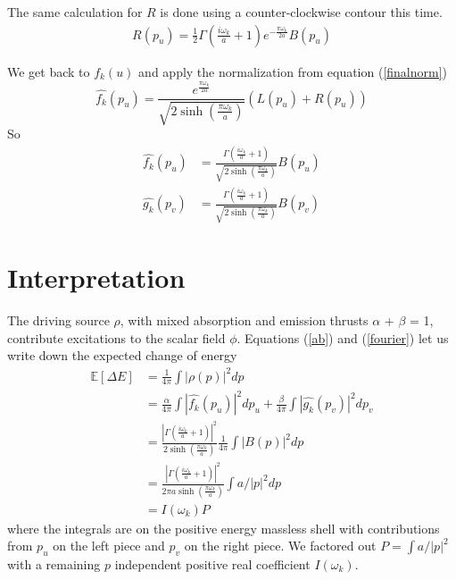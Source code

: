 \documentclass[12pt,a4paper]{article}
\begin{document}
The same calculation for $R$ is done using a counter-clockwise contour this time.
\begin{equation}
\begin{split}
  R(p_u) = \frac{1}{2}\Gamma\left(\frac{i\omega_k}{a} + 1\right) e^{-\frac{\pi \omega_k}{2a}} B(p_u)
\end{split}
\end{equation}

We get back to $f_k(u)$ and apply the normalization from equation (\ref{finalnorm})
\begin{equation}
\widehat{f_k}(p_u) = \frac{e^{\frac{\pi \omega_k}{2a}}}{\sqrt{2 \sinh \left({\frac{\pi\omega_k}{a}}\right)}}  ( L(p_u) + R(p_u) )
\end{equation}
So
\begin{equation}
\label{fourier}
\begin{split}
\widehat{f_k}(p_u) & = \frac{\Gamma\left(\frac{i\omega_k}{a} + 1\right)}{\sqrt{2 \sinh \left({\frac{\pi\omega_k}{a}}\right)}} B(p_u)\\
\widehat{g_k}(p_v) &= \frac{\Gamma\left(\frac{i\omega_k}{a} + 1\right)}{\sqrt{2 \sinh \left({\frac{\pi\omega_k}{a}}\right)}} B(p_v)
\end{split}
\end{equation}
\section{Interpretation}
The driving source $\rho$, with mixed absorption and emission thrusts $\alpha$ + $\beta$ = 1, contribute excitations to the scalar field $\phi$. Equations (\ref{ab}) and (\ref{fourier}) let us write down the expected change of energy
\begin{equation}  
  \label{number}
  \begin{split}
    \mathbb{E}[\Delta E] &= \frac{1}{4\pi} \int{|\rho(p)|^2 dp} \\
    &= \frac{\alpha}{4\pi} \int{\left|\widehat{f_k}(p_u)\right|^2 dp_u} + \frac{\beta}{4\pi}\int{\left|\widehat{g_k}(p_v)\right|^2dp_v} \\
    &= \frac{\left|\Gamma\left(\frac{i\omega_k}{a} + 1\right)\right|^2}{2 \sinh \left({\frac{\pi\omega_k}{a}}\right)} \frac{1}{4\pi} \int{{\left|B(p)\right|^2} dp} \\
    &=  \frac{\left|\Gamma\left(\frac{i\omega_k}{a} + 1\right)\right|^2}{2 \pi a \sinh \left({\frac{\pi\omega_k}{a}}\right)} \int{a/|p|^2 dp}\\  
&=I(\omega_k) P
  \end{split}
\end{equation}
where the integrals are on the positive energy massless shell with contributions from $p_u$ on the left piece and $p_v$ on the right piece.  We factored out $P = \int{a/|p|^2}$ with a remaining $p$ independent positive real coefficient $I(\omega_k)$.
\end{document}
